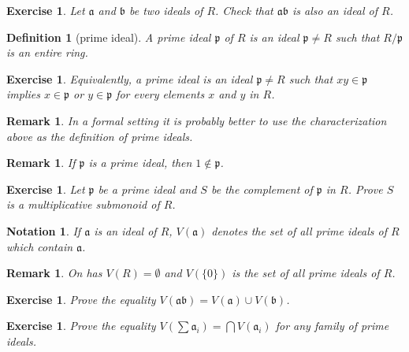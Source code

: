 \documentclass[12pt]{article}
\newtheorem{definition}[proposition]{Definition}
\newtheorem{remark}[proposition]{Remark}
\newtheorem{ex}[proposition]{Exercise}
\newtheorem{notation}{Notation}
\begin{document}
\begin{ex}
	Let $\mathfrak{a}$ and $\mathfrak{b}$ be two ideals of $R$. Check that $\mathfrak{a} \mathfrak{b}$ is also an ideal of $R$.
\end{ex}
		
\begin{definition}[prime ideal]
	A prime ideal $\mathfrak{p}$ of $R$ is an ideal $\mathfrak{p} \neq R$ such that $R/\mathfrak{p}$ is an entire ring. 	
\end{definition}

\begin{ex}
	Equivalently, a prime ideal is an ideal $\mathfrak{p} \neq R$ such that $x y \in \mathfrak{p}$ implies $x \in \mathfrak{p}$ or $y \in \mathfrak{p}$ for every elements $x$ and $y$ in $R$.
\end{ex}

\begin{remark}
	In a formal setting it is probably better to use the characterization above as the definition of prime ideals.
\end{remark}

\begin{remark}
	If $\mathfrak{p}$ is a prime ideal, then $1 \notin \mathfrak{p}$.
\end{remark}

\begin{ex}
	Let $\mathfrak{p}$ be a prime ideal and $S$ be the complement of $\mathfrak{p}$ in $R$. Prove $S$ is a multiplicative submonoid of $R$. 
\end{ex}		

\begin{notation}
	If $\mathfrak{a}$ is an ideal of $R$, $V(\mathfrak{a})$ denotes the set of all prime ideals of $R$ which contain $\mathfrak{a}$. 
\end{notation}

\begin{remark}
	On has $V(R) = \emptyset$ and $V(\lbrace 0 \rbrace)$ is the set of all prime ideals of $R$.
\end{remark}	

\begin{ex}
Prove the equality $V(\mathfrak{a} \mathfrak{b}) = V(\mathfrak{a}) \cup V(\mathfrak{b})$.	
\end{ex}

\begin{ex}
	Prove the equality $V(\sum \mathfrak{a}_i) = \bigcap V(\mathfrak{a}_i)$ for any family of prime ideals.
\end{ex}
\end{document}
